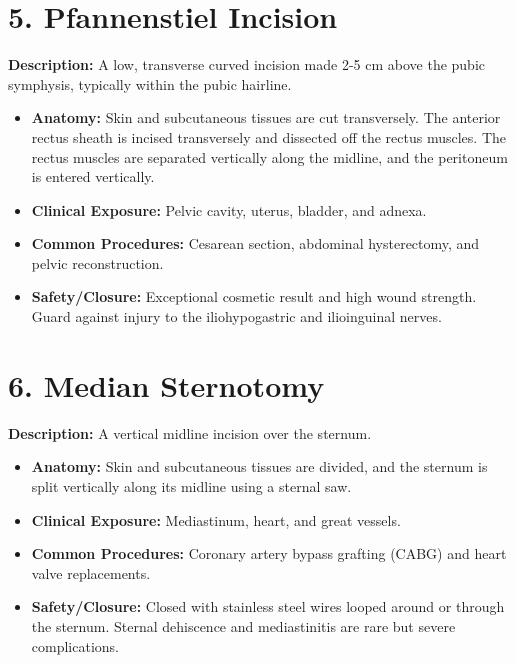 \section*{5. Pfannenstiel Incision}
\textbf{Description:} A low, transverse curved incision made 2-5 cm above the pubic symphysis, typically within the pubic hairline.
\begin{itemize}
  \item \textbf{Anatomy:} Skin and subcutaneous tissues are cut transversely. The anterior rectus sheath is incised transversely and dissected off the rectus muscles. The rectus muscles are separated vertically along the midline, and the peritoneum is entered vertically.
  \item \textbf{Clinical Exposure:} Pelvic cavity, uterus, bladder, and adnexa.
  \item \textbf{Common Procedures:} Cesarean section, abdominal hysterectomy, and pelvic reconstruction.
  \item \textbf{Safety/Closure:} Exceptional cosmetic result and high wound strength. Guard against injury to the iliohypogastric and ilioinguinal nerves.
\end{itemize}

\section*{6. Median Sternotomy}
\textbf{Description:} A vertical midline incision over the sternum.
\begin{itemize}
  \item \textbf{Anatomy:} Skin and subcutaneous tissues are divided, and the sternum is split vertically along its midline using a sternal saw.
  \item \textbf{Clinical Exposure:} Mediastinum, heart, and great vessels.
  \item \textbf{Common Procedures:} Coronary artery bypass grafting (CABG) and heart valve replacements.
  \item \textbf{Safety/Closure:} Closed with stainless steel wires looped around or through the sternum. Sternal dehiscence and mediastinitis are rare but severe complications.
\end{itemize}

\clearpage
